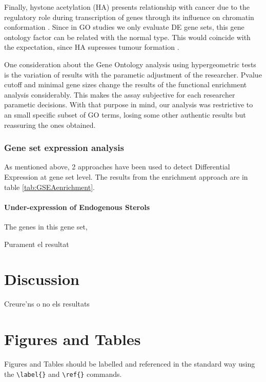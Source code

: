 \documentclass[9pt,twocolumn,twoside]{gsajnl}
\begin{document}
Finally, hystone acetylation (HA) presents relationship with cancer due to the regulatory role during transcription of genes through its influence on chromatin conformation \citep{histoneacet, histoneacet2, histoneacet3, histoneacet4}. Since in GO studies we only evaluate DE gene sets, this gene ontology factor can be related with the normal type. This would coincide with the expectation, since HA supresses tumour formation \cite{histonea}. 


One consideration about the Gene Ontology analysis using hypergeometric tests is the variation of results with the parametic adjustment of the researcher. Pvalue cutoff and minimal gene sizes change the results of the functional enrichment analysis considerably. This makes the assay subjective for each researcher parametic decisions. With that purpose in mind, our analysis was restrictive to an small specific subset of GO terms, losing some other authentic results but reassuring the ones obtained. 

\subsubsection*{Gene set expression analysis}

As mentioned above, 2 approaches have been used to detect Differential Expression at gene set level. The results from the enrichment approach are in table \ref{tab:GSEAenrichment}.

\paragraph{Under-expression of Endogenous Sterols } The genes in this gene set,


Purament el resultat


\section*{Discussion}

Creure'ns o no els resultats

\section*{Figures and Tables}

Figures and Tables should be labelled and referenced in the standard way using the \verb|\label{}| and \verb|\ref{}| commands.
\end{document}
